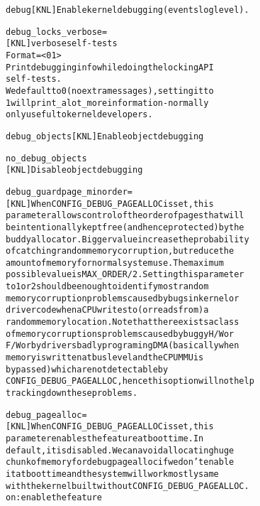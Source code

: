 \documentclass[a4paper,8pt,english]{sphinxmanual}
\begin{document}
\begin{alltt}
        debug           {[}KNL{]} Enable kernel debugging (events log level).

        debug\_locks\_verbose=
                        {[}KNL{]} verbose self-tests
                        Format=\textless{}0\textbar{}1\textgreater{}
                        Print debugging info while doing the locking API
                        self-tests.
                        We default to 0 (no extra messages), setting it to
                        1 will print \_a lot\_ more information - normally
                        only useful to kernel developers.

        debug\_objects   {[}KNL{]} Enable object debugging

        no\_debug\_objects
                        {[}KNL{]} Disable object debugging

        debug\_guardpage\_minorder=
                        {[}KNL{]} When CONFIG\_DEBUG\_PAGEALLOC is set, this
                        parameter allows control of the order of pages that will
                        be intentionally kept free (and hence protected) by the
                        buddy allocator. Bigger value increase the probability
                        of catching random memory corruption, but reduce the
                        amount of memory for normal system use. The maximum
                        possible value is MAX\_ORDER/2.  Setting this parameter
                        to 1 or 2 should be enough to identify most random
                        memory corruption problems caused by bugs in kernel or
                        driver code when a CPU writes to (or reads from) a
                        random memory location. Note that there exists a class
                        of memory corruptions problems caused by buggy H/W or
                        F/W or by drivers badly programing DMA (basically when
                        memory is written at bus level and the CPU MMU is
                        bypassed) which are not detectable by
                        CONFIG\_DEBUG\_PAGEALLOC, hence this option will not help
                        tracking down these problems.

        debug\_pagealloc=
                        {[}KNL{]} When CONFIG\_DEBUG\_PAGEALLOC is set, this
                        parameter enables the feature at boot time. In
                        default, it is disabled. We can avoid allocating huge
                        chunk of memory for debug pagealloc if we don't enable
                        it at boot time and the system will work mostly same
                        with the kernel built without CONFIG\_DEBUG\_PAGEALLOC.
                        on: enable the feature


\end{alltt}
\end{document}
